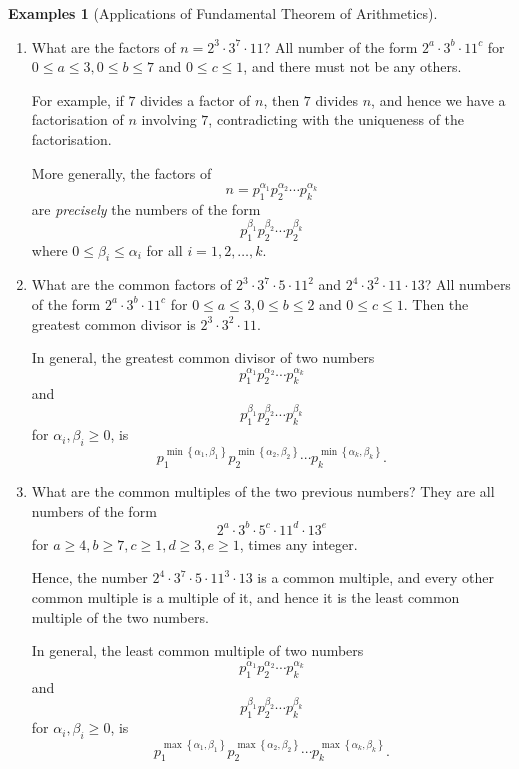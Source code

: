 \documentclass{article}
\theoremstyle{definition}
\newtheorem{examples}[theorem]{Examples}
\theoremstyle{remark}
\newcommand{\Bqty}[1]{\left\{#1\right\}}
\begin{document}
\begin{examples}[Applications of Fundamental Theorem of Arithmetics]
    \begin{enumerate}
        \item What are the factors of \(n = 2^3 \cdot 3^7 \cdot 11\)? All number of the form \(2^a \cdot 3^b \cdot 11^c\) for \(0 \leq a \leq 3, 0 \leq b \leq 7\) and \(0 \leq c \leq 1\), and there must not be any others.
        
        For example, if \(7\) divides a factor of \(n\), then \(7\) divides \(n\), and hence we have a factorisation of \(n\) involving \(7\), contradicting with the uniqueness of the factorisation.

        More generally, the factors of
        \[
            n = p_1^{\alpha_1} p_2^{\alpha_2} \cdots p_k^{\alpha_k}
        \]
        are \emph{precisely} the numbers of the form
        \[
            p_1^{\beta_1} p_2^{\beta_2} \cdots p_2^{\beta_k}
        \]
        where \(0 \leq \beta_i \leq \alpha_i\) for all \(i = 1, 2, \ldots, k\).

        \item What are the common factors of \(2^3 \cdot 3^7 \cdot 5 \cdot 11^2\) and \(2^4 \cdot 3^2 \cdot 11 \cdot 13\)? All numbers of the form \(2^a \cdot 3^b \cdot 11^c\) for \(0 \leq a \leq 3, 0 \leq b \leq 2\) and \(0 \leq c \leq 1\). Then the greatest common divisor is \(2^3 \cdot 3^2 \cdot 11\).
        
        In general, the greatest common divisor of two numbers
        \[
            p_1^{\alpha_1} p_2^{\alpha_2} \cdots p_k^{\alpha_k}
        \]
        and
        \[
            p_1^{\beta_1} p_2^{\beta_2} \cdots p_k^{\beta_k}
        \]
        for \(\alpha_i, \beta_i \geq 0\), is
        \[
            p_1^{\min\Bqty{\alpha_1, \beta_1}} p_2^{\min\Bqty{\alpha_2, \beta_2}} \cdots p_k^{\min\Bqty{\alpha_k, \beta_k}}.
        \]

        \item What are the common multiples of the two previous numbers? They are all numbers of the form
        \[
            2^a \cdot 3^b \cdot 5^c \cdot 11^d \cdot 13^e
        \]
        for \(a \geq 4, b \geq 7, c \geq 1, d \geq 3, e \geq 1\), times any integer.

        Hence, the number \(2^4 \cdot 3^7 \cdot 5 \cdot 11^3 \cdot 13\) is a common multiple, and every other common multiple is a multiple of it, and hence it is the least common multiple of the two numbers.

        In general, the least common multiple of two numbers
        \[
            p_1^{\alpha_1} p_2^{\alpha_2} \cdots p_k^{\alpha_k}
        \]
        and
        \[
            p_1^{\beta_1} p_2^{\beta_2} \cdots p_k^{\beta_k}
        \]
        for \(\alpha_i, \beta_i \geq 0\), is
        \[
            p_1^{\max\Bqty{\alpha_1, \beta_1}} p_2^{\max\Bqty{\alpha_2, \beta_2}} \cdots p_k^{\max\Bqty{\alpha_k, \beta_k}}.
        \]
    \end{enumerate}
\end{examples}
\end{document}
